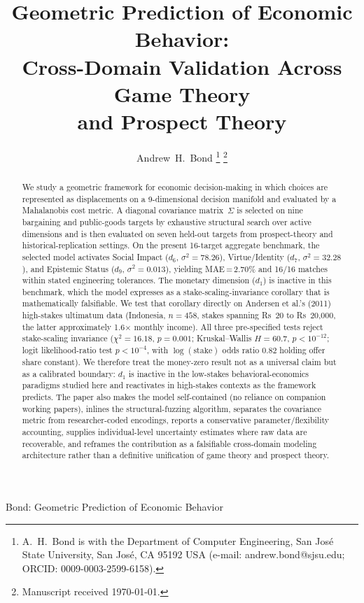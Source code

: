 \documentclass[journal]{IEEEtran}
\begin{document}
\title{Geometric Prediction of Economic Behavior:\\Cross-Domain Validation Across Game Theory\\and Prospect Theory}

\author{Andrew~H.~Bond%
\thanks{A.~H.~Bond is with the Department of Computer Engineering, San Jos\'{e} State University, San Jos\'{e}, CA 95192 USA (e-mail: andrew.bond@sjsu.edu; ORCID: 0009-0003-2599-6158).}%
\thanks{Manuscript received \today.}}

%
{Bond: Geometric Prediction of Economic Behavior}

\maketitle

\begin{abstract}
We study a geometric framework for economic decision-making in which choices are represented as displacements on a 9-dimensional decision manifold and evaluated by a Mahalanobis cost metric.
A diagonal covariance matrix~$\Sigma$ is selected on nine bargaining and public-goods targets by exhaustive structural search over active dimensions and is then evaluated on seven held-out targets from prospect-theory and historical-replication settings.
On the present 16-target aggregate benchmark, the selected model activates Social Impact ($d_6$, $\sigma^2{=}78.26$), Virtue/Identity ($d_7$, $\sigma^2{=}32.28$), and Epistemic Status ($d_9$, $\sigma^2{=}0.013$), yielding MAE\,=\,2.70\% and 16/16 matches within stated engineering tolerances.
The monetary dimension ($d_1$) is inactive in this benchmark, which the model expresses as a stake-scaling-invariance corollary that is mathematically falsifiable.
We test that corollary directly on Andersen et al.'s (2011) high-stakes ultimatum data (Indonesia, $n{=}458$, stakes spanning Rs~20 to Rs~20{,}000, the latter approximately 1.6$\times$ monthly income).
All three pre-specified tests reject stake-scaling invariance ($\chi^2{=}16.18$, $p{=}0.001$; Kruskal--Wallis $H{=}60.7$, $p{<}10^{-12}$; logit likelihood-ratio test $p{<}10^{-4}$, with $\log(\text{stake})$ odds ratio $0.82$ holding offer share constant).
We therefore treat the money-zero result not as a universal claim but as a calibrated boundary: $d_1$ is inactive in the low-stakes behavioral-economics paradigms studied here and reactivates in high-stakes contexts as the framework predicts.
The paper also makes the model self-contained (no reliance on companion working papers), inlines the structural-fuzzing algorithm, separates the covariance metric from researcher-coded encodings, reports a conservative parameter/flexibility accounting, supplies individual-level uncertainty estimates where raw data are recoverable, and reframes the contribution as a falsifiable cross-domain modeling architecture rather than a definitive unification of game theory and prospect theory.
\end{abstract}
\end{document}
